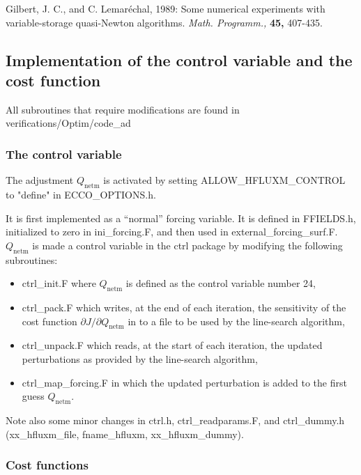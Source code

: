 Gilbert, J. C., and C. Lemar\'echal, 1989: Some numerical experiments with
variable-storage quasi-Newton algorithms. \textit{Math. Programm.,}
\textbf{45,} 407-435.

\subsection{Implementation of the control variable and the cost function}

All subroutines that require modifications are found in
verifications/Optim/code\_ad

\subsubsection{The control variable}

The adjustment $Q_\mathrm{netm}$ is activated by setting
ALLOW\_HFLUXM\_CONTROL to "define" in ECCO\_OPTIONS.h.

It is first implemented as a ``normal'' forcing variable. It is defined in
FFIELDS.h, initialized to zero in ini\_forcing.F, and then used in
external\_forcing\_surf.F. $Q_\mathrm{netm}$ is made a control variable in
the ctrl package by modifying the following subroutines:

\begin{itemize}
\item ctrl\_init.F where $Q_\mathrm{netm}$ is defined as the control variable
number 24,

\item ctrl\_pack.F which writes, at the end of each iteration, the sensitivity
of the cost function $\partial J/\partial Q_\mathrm{netm}$ in to a file to be
used by the line-search algorithm,

\item ctrl\_unpack.F which reads, at the start of each iteration, the updated
perturbations as provided by the line-search algorithm,

\item ctrl\_map\_forcing.F in which the updated perturbation is added to the
first guess $Q_\mathrm{netm}$.
\end{itemize}

Note also some minor changes in ctrl.h, ctrl\_readparams.F, and ctrl\_dummy.h
(xx\_hfluxm\_file, fname\_hfluxm, xx\_hfluxm\_dummy).

\subsubsection{Cost functions}

